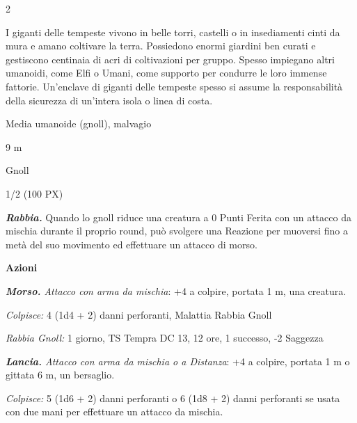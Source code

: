 \begin{multicols}{2}
{I giganti delle tempeste vivono in belle torri, castelli o in insediamenti cinti da mura e amano coltivare la terra. Possiedono enormi giardini ben curati e gestiscono centinaia di acri di coltivazioni per gruppo. Spesso impiegano altri umanoidi, come Elfi o Umani, come supporto per condurre le loro immense fattorie. Un'enclave di giganti delle tempeste spesso si assume la responsabilità della sicurezza di un'intera isola o linea di costa.

\begin{description}[noitemsep, topsep=0pt, parsep=0pt, partopsep=0pt, itemsep=1pt, leftmargin=2.35cm,  labelwidth=2.2cm, itemindent=0cm, listparindent=0pt] %
\setlength{\baselineskip}{10pt}
\item[\textbf{Taglia/Tipo}] Media umanoide (gnoll), malvagio
\item[\textbf{Caratt.}] 
\item[\textbf{Punti Ferita}] 
\item[\textbf{Movimento}] 9 m
\item[\textbf{Tiri Salvez.}] 
\item[\textbf{Sensi}] 
\item[\textbf{Linguaggi}] Gnoll
\item[\textbf{Sfida}] 1/2 (100 PX)
\end{description}
\smallskip

\emph{\textbf{Rabbia.}} Quando lo gnoll riduce una creatura a 0 Punti Ferita con un attacco da mischia durante il proprio round, può svolgere una Reazione per muoversi fino a metà del suo movimento ed effettuare un attacco di morso.

\textbf{Azioni}

\emph{\textbf{Morso.} Attacco con arma da mischia}: +4 a colpire, portata 1 m, una creatura.

\emph{Colpisce:} 4 (1d4 + 2) danni perforanti, Malattia Rabbia Gnoll

\emph{Rabbia Gnoll:} 1 giorno, TS Tempra DC 13, 12 ore, 1 successo, -2 Saggezza

\emph{\textbf{Lancia.} Attacco con arma da mischia o a Distanza}: +4 a colpire, portata 1 m o gittata 6 m, un bersaglio.

\emph{Colpisce:} 5 (1d6 + 2) danni perforanti o 6 (1d8 + 2) danni perforanti se usata con due mani per effettuare un attacco da mischia.

}
\end{multicols}
